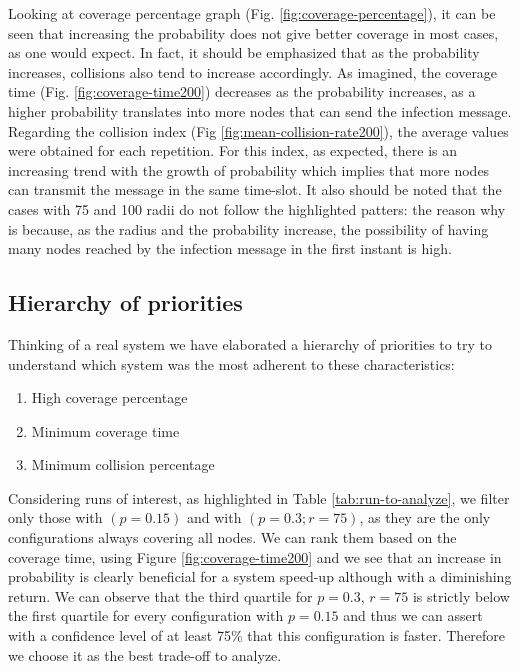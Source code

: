 \noindent Looking at coverage percentage graph (Fig. \ref{fig:coverage-percentage}), it can be seen that increasing the probability does not give better coverage in most cases, as one would expect. In fact, it should be emphasized that as the probability increases, collisions also tend to increase accordingly. As imagined, the coverage time (Fig. \ref{fig:coverage-time200}) decreases as the probability increases, as a higher probability translates into more nodes that can send the infection message. Regarding the collision index (Fig \ref{fig:mean-collision-rate200}), the average values were obtained for each repetition. For this index, as expected, there is an increasing trend with the growth of probability which implies that more nodes can transmit the message in the same time-slot. It also should be noted that the cases with 75 and 100 radii do not follow the highlighted patters: the reason why is because, as the radius and the probability increase, the possibility of having many nodes reached by the infection message in the first instant is high.
\clearpage 

\subsection{Hierarchy of priorities}
Thinking of a real system we have elaborated a hierarchy of priorities to try to understand which system was the most adherent to these characteristics:

\begin{enumerate}
\item High coverage percentage
\item Minimum coverage time
\item Minimum collision percentage
\end{enumerate}

Considering runs of interest, as highlighted in Table \ref{tab:run-to-analyze}, we filter only those with $(p=0.15)$ and with $(p=0.3;r=75)$, as they are the only configurations always covering all nodes.
We can rank them based on the coverage time, using Figure \ref{fig:coverage-time200} and we see that an increase in probability is clearly beneficial for a system speed-up although with a diminishing return. We can observe that the third quartile for $p=0.3$, $r=75$ is strictly below the first quartile for every configuration with $p=0.15$ and thus we can assert with a confidence level of at least 75\% that this configuration is faster. Therefore we choose it as the best trade-off to analyze.

